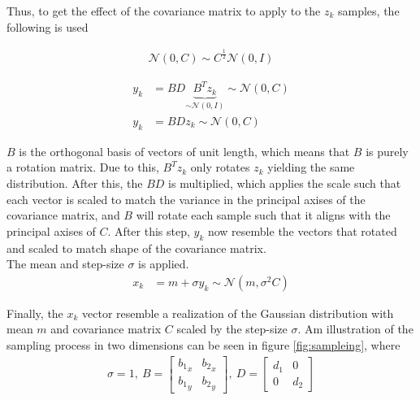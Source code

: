 Thus, to get the effect of the covariance matrix to apply to the $z_k$
samples, the following is used

\begin{align}
\mathcal{N}\left( 0, C \right) \sim C^{\frac{1}{2}} \mathcal{N}\left( 0, I \right)
\end{align}

\begin{align}
y_{k} &= B D \underbrace{B^{T} z_{k}}_{\sim \mathcal{N}(0, I)} \sim \mathcal{N}(0, C)\\
y_{k} &= B Dz_{k} \sim \mathcal{N}(0, C) \label{eq:sampley}
\end{align}

$B$ is the orthogonal basis of vectors of unit length, which means that 
$B$ is purely a rotation matrix. Due to this, $B^{T} z_{k}$ only rotates
$z_k$ yielding the same distribution. After this, the $BD$ is multiplied,
which applies the scale such that each vector is scaled to match the
variance in the principal axises of the covariance matrix, and $B$ 
will rotate each sample such that it aligns with the principal axises
of $C$. After this step, $y_{k}$ now resemble the vectors that rotated and scaled
to match shape of the covariance matrix.\\

The mean and step-size $\sigma$ is applied.
\begin{align}
x_{k} &= m + \sigma y_{k} \sim \mathcal{N}(m, \sigma^2 C) \label{eq:finalSample}
\end{align}



Finally, the $x_{k}$ vector resemble a realization of the Gaussian distribution
with mean $m$ and covariance matrix $C$ scaled by the step-size $\sigma$.
Am illustration of the sampling process in two dimensions can be seen in figure \ref{fig:sampleing}, where 
\begin{align}
\sigma = 1,\ B = \begin{bmatrix}
{b_1}_x & {b_2}_x\\
{b_1}_y & {b_2}_y
\end{bmatrix},\ D = \begin{bmatrix}
d_1 & 0\\
0   & d_2
\end{bmatrix}
\end{align}



